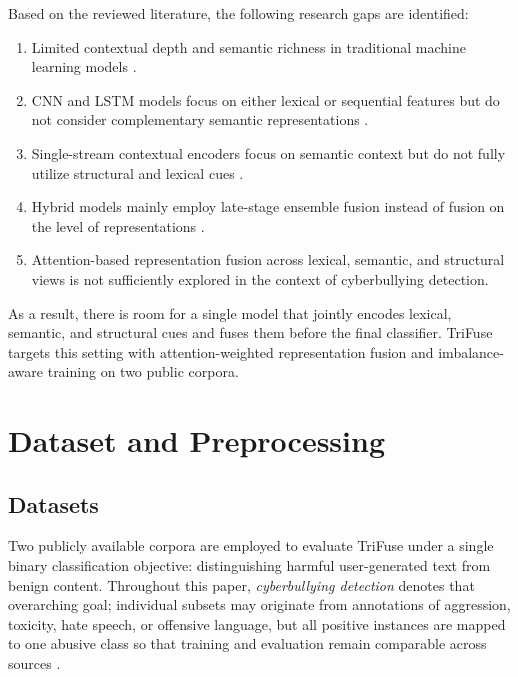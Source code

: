 Based on the reviewed literature, the following research gaps are identified:
\begin{enumerate}
\item Limited contextual depth and semantic richness in traditional machine learning models \cite{ref5, ref6, ref18}.
\item CNN and LSTM models focus on either lexical or sequential features but do not consider complementary semantic representations \cite{ref7, ref8}.
\item Single-stream contextual encoders focus on semantic context but do not fully utilize structural and lexical cues \cite{ref9}.
\item Hybrid models mainly employ late-stage ensemble fusion instead of fusion on the level of representations \cite{ref14, ref15}.
\item Attention-based representation fusion across lexical, semantic, and structural views is not sufficiently explored in the context of cyberbullying detection.
\end{enumerate}

As a result, there is room for a single model that jointly encodes lexical, semantic, and structural cues and fuses them before the final classifier. TriFuse targets this setting with attention-weighted representation fusion and imbalance-aware training on two public corpora.

\section{Dataset and Preprocessing}

\subsection{Datasets}

Two publicly available corpora are employed to evaluate TriFuse under a single binary classification objective: distinguishing harmful user-generated text from benign content. Throughout this paper, \emph{cyberbullying detection} denotes that overarching goal; individual subsets may originate from annotations of aggression, toxicity, hate speech, or offensive language, but all positive instances are mapped to one abusive class so that training and evaluation remain comparable across sources \cite{ref12, ref13}.

